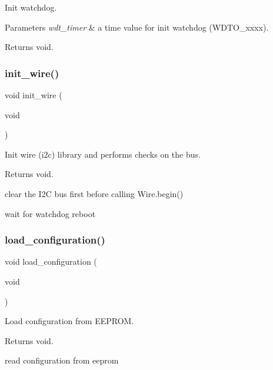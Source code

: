 Init watchdog. 


\begin{DoxyParams}{Parameters}
{\em wdt\+\_\+timer} & a time value for init watchdog (W\+D\+T\+O\+\_\+xxxx). \\
\hline
\end{DoxyParams}
\begin{DoxyReturn}{Returns}
void. 
\end{DoxyReturn}
\mbox{\label{rmap_8ino_a2441543100bf8421f56edd622a2c1d9a}} 
\subsubsection{\texorpdfstring{init\+\_\+wire()}{init\_wire()}}
{\footnotesize\ttfamily void init\+\_\+wire (\begin{DoxyParamCaption}\item[{void}]{ }\end{DoxyParamCaption})}



Init wire (i2c) library and performs checks on the bus. 

\begin{DoxyReturn}{Returns}
void. 
\end{DoxyReturn}
clear the I2C bus first before calling Wire.\+begin()

wait for watchdog reboot \mbox{\label{rmap_8ino_a32a64a2800c724fb28e10636f2ec20b9}} 
\subsubsection{\texorpdfstring{load\+\_\+configuration()}{load\_configuration()}}
{\footnotesize\ttfamily void load\+\_\+configuration (\begin{DoxyParamCaption}\item[{void}]{ }\end{DoxyParamCaption})}



Load configuration from E\+E\+P\+R\+OM. 

\begin{DoxyReturn}{Returns}
void. 
\end{DoxyReturn}
read configuration from eeprom \mbox{\label{rmap_8ino_a161bca6629368a46242fec07a965966a}} 
